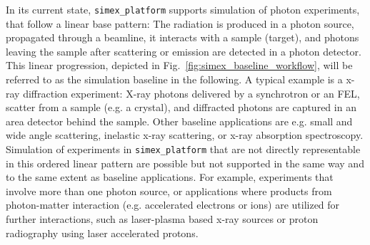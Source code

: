 \documentclass[12pt]{scrartcl}
\begin{document}
In its current state, \texttt{simex\_platform} supports simulation of
photon experiments, that follow a linear base pattern: The radiation is produced
in a photon source, propagated through a beamline, it interacts with a sample
(target), and photons leaving the sample after scattering or emission are
detected in a photon detector. This linear progression, depicted in
Fig.~\ref{fig:simex_baseline_workflow}, will be referred to as
the simulation  baseline in the following. A typical example is a x-ray diffraction
experiment: X-ray photons delivered by a synchrotron or an FEL, scatter from a
sample (e.g. a crystal), and diffracted photons are captured in
an area detector behind the sample. Other baseline applications are e.g. small
and wide angle scattering, inelastic x-ray scattering, or x-ray absorption
spectroscopy. Simulation of experiments in \texttt{simex\_platform} that are not directly
representable in this ordered linear pattern are possible but not supported in the same way and
to the same extent as baseline applications. For example,
experiments that involve more than one photon source, or applications where
products from photon-matter interaction (e.g. accelerated electrons or ions) are
utilized for further interactions, such as laser-plasma based x-ray sources or
proton radiography using laser accelerated protons.
\end{document}
